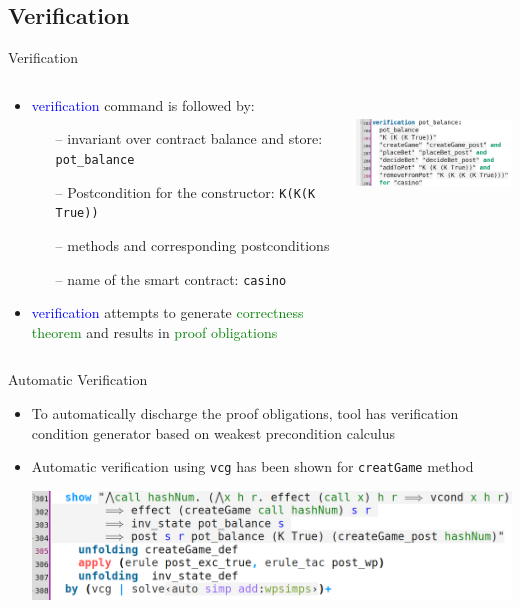\documentclass[aspectratio=169]{beamer}
\begin{document}
\subsection{Verification}
\begin{frame}{Verification}
\begin{columns}
\begin{column}{0.50\textwidth}
  \begin{itemize}
\item \textcolor{blue}{verification} command is followed by:
\begin{itemize}
\item[--] invariant over contract balance and store: \texttt{pot\_balance} 
\item[--] Postcondition for the constructor: \texttt{K(K(K True))}
\item[--] methods and corresponding postconditions 
\item[--] name of the smart contract: \texttt{casino}
\end{itemize}
\item \textcolor{blue}{verification} attempts to generate \textcolor{green}{correctness theorem} and results in \textcolor{green}{proof obligations}
\end{itemize}
\end{column}
\begin{column}{0.50\textwidth}  %
  \begin{center}
     \includegraphics[width=\textwidth, height=3cm, keepaspectratio]{ver_conract}
     \end{center}
\end{column}
\end{columns}
\end{frame}


\begin{frame}{Automatic Verification}
\begin{itemize}
\item To automatically discharge the proof obligations, tool has verification condition generator based on weakest precondition calculus
\item Automatic verification using \texttt{vcg} has been shown for \texttt{creatGame} method
\begin{center}\vspace{2mm}
		\includegraphics[width=.95\textwidth]{inv_contract.png}
	\end{center}\vspace{2mm}
\end{itemize}
\end{frame}
%
\end{document}
